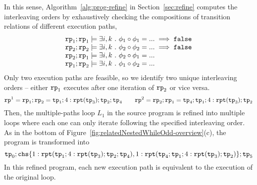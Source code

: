 In this sense, Algorithm~\ref{alg:prog-refine} in Section~\ref{sec:refine} computes the interleaving orders
by exhaustively checking the compositions of transition relations of different execution paths,
\begin{equation}
    \begin{array}{l}
        \mathtt{rp}_1 ; \mathtt{rp}_1 \models \exists i, k ~.~ \phi_1 \circ \phi_1 = ... \implies \mathtt{false}\\
        \mathtt{rp}_2 ; \mathtt{rp}_2 \models \exists i, k ~.~ \phi_2 \circ \phi_2 = ... \implies \mathtt{false} \\
        \mathtt{rp}_2 ; \mathtt{rp}_1 \models \exists i, k ~.~ \phi_2 \circ \phi_1 = ...  \\
        \mathtt{rp}_1 ; \mathtt{rp}_2 \models \exists i, k ~.~ \phi_1 \circ \phi_2 = ... 
    \end{array}
\end{equation}
Only two execution paths are feasible, so we identify two unique interleaving orders --
either $\mathtt{rp}_1$ executes after one iteration of $\mathtt{rp}_2$ or vice versa.
\[
    \mathtt{rp}^1 = \mathtt{rp}_1 ; \mathtt{rp}_2 = \mathtt{tp}_1; 4:\mathtt{rpt}(\mathtt{tp}_3); \mathtt{tp}_2; \mathtt{tp}_4
    \qquad
    \mathtt{rp}^2 = \mathtt{rp}_2 ; \mathtt{rp}_1 = \mathtt{tp}_4; \mathtt{tp}_1; 4:\mathtt{rpt}(\mathtt{tp}_3); \mathtt{tp}_2
\]
Then, the multiple-paths loop $L_1$ in the source program is refined
into multiple loops where each one can only iterate following the specified interleaving order.
As in the bottom of Figure~\ref{fig:relatedNestedWhileOdd-overview}(c),
the program is transformed into 
\[
    \tpath_0 ; \rpchoose{ 1: \rprepeat(\tpath_1; 4:\rprepeat(\tpath_3); \tpath_2; \tpath_4), 
1: \rprepeat(\tpath_4; \tpath_1; 4:\rprepeat(\tpath_3); \tpath_2) }; \tpath_5
\]
In this refined program, 
each new execution path is equivalent to the execution of the original loop. 


